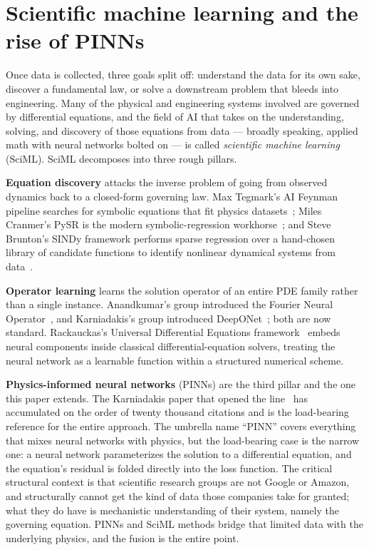 \documentclass[11pt]{article}
\begin{document}
\section{Scientific machine learning and the rise of PINNs}

Once data is collected, three goals split off: understand the data for its own sake, discover a fundamental law, or solve a downstream problem that bleeds into engineering. Many of the physical and engineering systems involved are governed by differential equations, and the field of AI that takes on the understanding, solving, and discovery of those equations from data --- broadly speaking, applied math with neural networks bolted on --- is called \emph{scientific machine learning} (SciML). SciML decomposes into three rough pillars.

\textbf{Equation discovery} attacks the inverse problem of going from observed dynamics back to a closed-form governing law. Max Tegmark's AI Feynman pipeline searches for symbolic equations that fit physics datasets~\cite{UdrescuTegmark2020}; Miles Cranmer's PySR is the modern symbolic-regression workhorse~\cite{Cranmer2023PySR}; and Steve Brunton's SINDy framework performs sparse regression over a hand-chosen library of candidate functions to identify nonlinear dynamical systems from data~\cite{Brunton2016SINDy}.

\textbf{Operator learning} learns the solution operator of an entire PDE family rather than a single instance. Anandkumar's group introduced the Fourier Neural Operator~\cite{Li2021FNO}, and Karniadakis's group introduced DeepONet~\cite{Lu2021DeepONet}; both are now standard. Rackauckas's Universal Differential Equations framework~\cite{Rackauckas2020UDE} embeds neural components inside classical differential-equation solvers, treating the neural network as a learnable function within a structured numerical scheme.

\textbf{Physics-informed neural networks} (PINNs) are the third pillar and the one this paper extends. The Karniadakis paper that opened the line~\cite{Raissi2019PINN} has accumulated on the order of twenty thousand citations and is the load-bearing reference for the entire approach. The umbrella name ``PINN'' covers everything that mixes neural networks with physics, but the load-bearing case is the narrow one: a neural network parameterizes the solution to a differential equation, and the equation's residual is folded directly into the loss function. The critical structural context is that scientific research groups are not Google or Amazon, and structurally cannot get the kind of data those companies take for granted; what they do have is mechanistic understanding of their system, namely the governing equation. PINNs and SciML methods bridge that limited data with the underlying physics, and the fusion is the entire point.
\end{document}
